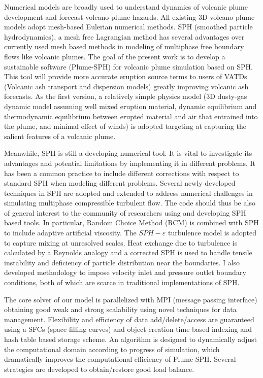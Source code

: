 Numerical models are broadly used to understand dynamics of volcanic plume development and forecast volcano plume hazards. All existing 3D volcano plume models adopt mesh-based Eulerian numerical methods. 
SPH (smoothed particle hydrodynamics), a mesh free Lagrangian method has several advantages over currently used mesh based methods in modeling of multiphase free boundary flows like volcanic plumes. The goal of the present work is to develop a sustainable software (Plume-SPH) for volcanic plume simulation based on SPH.
This tool will provide more accurate eruption source terms to users of VATDs (Volcanic ash transport and dispersion models) greatly improving volcanic ash forecasts.
As the first version, a relatively simple physics model (3D dusty-gas dynamic model assuming well mixed eruption material, dynamic equilibrium and thermodynamic equilibrium between erupted material and air that entrained into the plume, and minimal effect of winds) is adopted targeting at capturing the salient features of a volcanic plume. 
 
Meanwhile, SPH is still a developing numerical tool. It is vital to investigate its advantages and potential limitations by implementing it in different problems. It has been a common practice to include different corrections with respect to standard SPH when modeling different problems. Several newly developed techniques in SPH are adopted and extended to address numerical challenges in simulating multiphase compressible turbulent flow. The code should thus be also of general interest to the community of researchers using and developing SPH based tools. In particular, Random Choice Method (RCM) is combined with SPH to include adaptive artificial viscosity. The $SPH-\varepsilon$ turbulence model is adopted to capture mixing at unresolved scales. Heat exchange due to turbulence is calculated by a Reynolds analogy and a corrected SPH is used to handle tensile instability and deficiency of particle distribution near the boundaries. I also developed methodology to impose velocity inlet and pressure outlet boundary conditions, both of which are scarce in traditional implementations of SPH.

The core solver of our model is parallelized with MPI (message passing interface) obtaining good weak and strong scalability using novel techniques for data management. Flexibility and efficiency of data add/delete/access are guaranteed using a SFCs (space-filling curves) and object creation time based indexing and hash table based storage scheme. An algorithm is designed to dynamically adjust the computational domain according to progress of simulation, which dramatically improves the computational efficiency of Plume-SPH. Several strategies are developed to obtain/restore good load balance.

